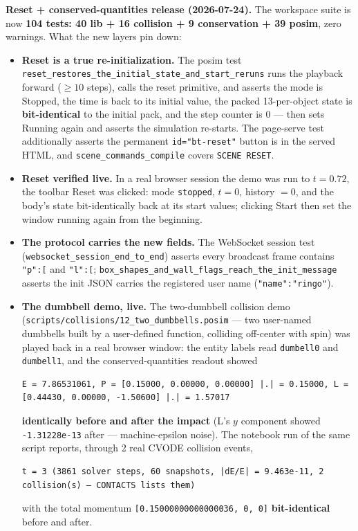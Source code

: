 \documentclass[11pt]{article}
\newcommand{\kw}[1]{\texttt{\uppercase{#1}}}
\newcommand{\code}[1]{\texttt{#1}}
\begin{document}
\textbf{Reset + conserved-quantities release (2026-07-24).} The
workspace suite is now \textbf{104 tests: 40 lib + 16 collision + 9
conservation + 39 posim}, zero warnings. What the new layers pin
down:

\begin{itemize}
\item \textbf{Reset is a true re-initialization.} The posim test
      \code{reset\_restores\_the\_initial\_state\_and\_start\_reruns}
      runs the playback forward ($\geq 10$ steps), calls the reset
      primitive, and asserts the mode is Stopped, the time is back to
      its initial value, the packed 13-per-object state is
      \textbf{bit-identical} to the initial pack, and the step
      counter is 0 --- then sets Running again and asserts the
      simulation re-starts. The page-serve test additionally asserts
      the permanent \code{id="bt-reset"} button is in the served
      HTML, and \code{scene\_commands\_compile} covers
      \kw{scene reset}.
\item \textbf{Reset verified live.} In a real browser session the
      demo was run to $t = 0.72$, the toolbar Reset was clicked: mode
      \code{stopped}, $t = 0$, history $= 0$, and the body's state
      bit-identically back at its start values; clicking Start then
      set the window running again from the beginning.
\item \textbf{The protocol carries the new fields.} The WebSocket
      session test (\code{websocket\_session\_end\_to\_end}) asserts
      every broadcast frame contains \code{"p":[} and \code{"l":[};
      \code{box\_shapes\_and\_wall\_flags\_reach\_the\_init\_message}
      asserts the init JSON carries the registered user name
      (\code{"name":"ringo"}).
\item \textbf{The dumbbell demo, live.} The two-dumbbell collision
      demo (\code{scripts/collisions/12\_two\_dumbbells.posim} ---
      two user-named dumbbells built by a user-defined function,
      colliding off-center with spin) was played back in a real
      browser window: the entity labels read \code{dumbell0} and
      \code{dumbell1}, and the conserved-quantities readout showed
\begin{lstlisting}
E = 7.86531061, P = [0.15000, 0.00000, 0.00000] |.| = 0.15000, L = [0.44430, 0.00000, -1.50600] |.| = 1.57017
\end{lstlisting}
      \textbf{identically before and after the impact} (L's $y$
      component showed \code{-1.31228e-13} after ---
      machine-epsilon noise). The notebook run of the same script
      reports, through 2 real CVODE collision events,
\begin{lstlisting}
t = 3 (3861 solver steps, 60 snapshots, |dE/E| = 9.463e-11, 2 collision(s) — CONTACTS lists them)
\end{lstlisting}
      with the total momentum \code{[0.15000000000000036, 0, 0]}
      \textbf{bit-identical} before and after.
\end{itemize}
\end{document}
